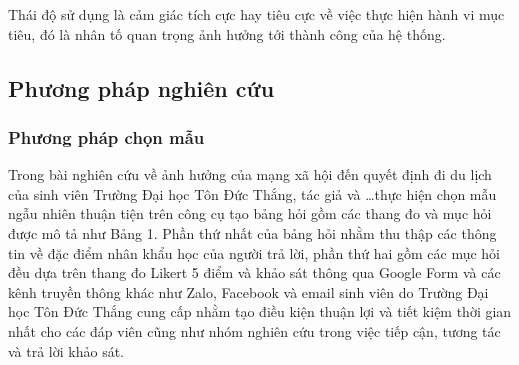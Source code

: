 		Thái độ sử dụng là cảm giác tích cực hay tiêu cực về việc thực hiện hành vi mục tiêu, đó là nhân tố quan trọng ảnh hưởng tới thành công của hệ thống.
		
	\subsection{Phương pháp nghiên cứu}
		\subsubsection{Phương pháp chọn mẫu}
		
		Trong bài nghiên cứu về ảnh hưởng của mạng xã hội đến quyết định đi du lịch của sinh viên Trường Đại học Tôn Đức Thắng, tác giả và \dots thực hiện chọn mẫu ngẫu nhiên thuận tiện trên công cụ tạo bảng hỏi gồm các thang đo và mục hỏi được mô tả như Bảng 1. Phần thứ nhất của bảng hỏi nhằm thu thập các thông tin về đặc điểm nhân khẩu học của người trả lời, phần thứ hai gồm các mục hỏi đều dựa trên thang đo Likert 5 điểm và khảo sát thông qua Google Form và các kênh truyền thông khác như Zalo, Facebook và email sinh viên do Trường Đại học Tôn Đức Thắng cung cấp nhằm tạo điều kiện thuận lợi và tiết kiệm thời gian nhất cho các đáp viên cũng như nhóm nghiên cứu trong việc tiếp cận, tương tác và trả lời khảo sát.
		
		
	